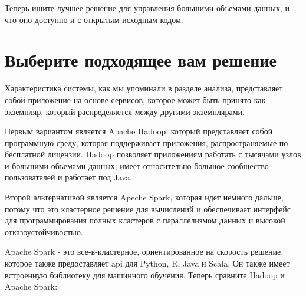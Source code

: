 Теперь ищите лучшее решение для управления большими объемами данных, и что оно доступно и с открытым исходным кодом.

\section{Выберите подходящее вам решение}

Характеристика системы, как мы упоминали в разделе анализа, представляет собой приложение на основе сервисов, которое может быть принято как экземпляр, который распределяется между другими экземплярами.

Первым вариантом является Apache Hadoop, который представляет собой программную среду, которая поддерживает приложения, распространяемые по бесплатной лицензии. Hadoop позволяет приложениям работать с тысячами узлов и большими объемами данных, имеет относительно большое сообщество пользователей и работает под Java.

Второй альтернативой является Apeche Spark, которая идет немного дальше, потому что это кластерное решение для вычислений и обеспечивает интерфейс для программирования полных кластеров с параллелизмом данных и высокой отказоустойчивостью.

Apache Spark - это все-в-кластерное, ориентированное на скорость решение, которое также предоставляет api для Python, R, Java и Scala. Он также имеет встроенную библиотеку для машинного обучения. Теперь сравните Hadoop и Apache Spark:

